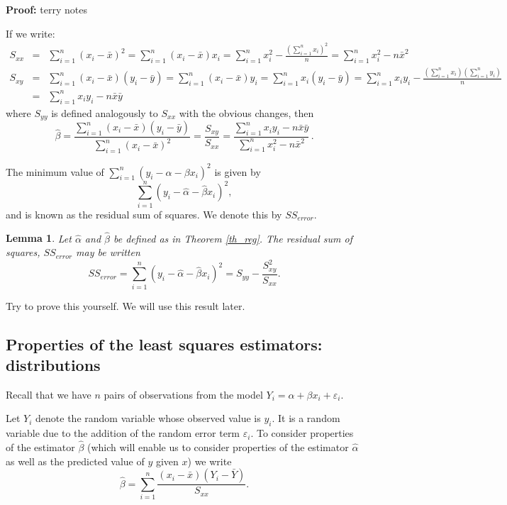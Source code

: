 \documentclass[12pt]{article}
\newtheorem{lemma}[theorem]{Lemma}
\begin{document}
\begin{mdframed}
{\bf Proof:}
\textcolor[rgb]{1.00,1.00,1.00}{terry notes\lipsum[1-7]}
\end{mdframed}

If we write:
\begin{eqnarray*}
S_{xx}&=&\sum_{i=1}^{n}(x_{i}-\bar{x})^{2}=\sum_{i=1}^{n}(x_{i}-\bar{x})x_{i}=\sum_{i=1}^{n}x_{i}^{2}-\frac{(\sum_{i=1}^{n}x_{i})^{2}}{n}=\sum_{i=1}^{n}x_{i}^{2}-n\bar{x}^{2}\\
S_{xy}&=&\sum_{i=1}^{n}(x_{i}-\bar{x})(y_{i}-\bar{y})=\sum_{i=1}^{n}(x_{i}-\bar{x})y_{i}=\sum_{i=1}^{n}x_{i}(y_{i}-\bar{y})=\sum_{i=1}^{n}x_{i}y_{i}-\frac{\left(\sum_{i=1}^{n}x_{i}\right)\left(\sum_{i=1}^{n}y_{i}\right)}{n}\\&=&\sum_{i=1}^{n}x_{i}y_{i}-n\bar{x}\bar{y}
\end{eqnarray*}
where $S_{yy}$ is defined analogously to $S_{xx}$ with the obvious changes, then $$\hat{\beta}=\frac{\sum_{i=1}^{n}(x_{i}-\bar{x})(y_{i}-\bar{y})}{\sum_{i=1}^{n}(x_{i}-\bar{x})^{2}}=\frac{S_{xy}}{S_{xx}}=\frac{\sum_{i=1}^{n}x_{i}y_{i}-n\bar{x}\bar{y}}{\sum_{i=1}^{n}x_{i}^{2}-n\bar{x}^{2}}\,.$$

The minimum value of $\sum_{i=1}^{n}(y_{i}-\alpha-\beta x_{i})^{2}$ is given by $$\sum_{i=1}^{n}(y_{i}-\hat{\alpha}-\hat{\beta} x_{i})^{2}, $$ and is known as the residual sum of squares. We denote this by $SS_{error}$.
\begin{lemma}
Let $\hat{\alpha}$ and $\hat{\beta}$ be defined as in Theorem \ref{th_reg}. The residual sum of squares, $SS_{error}$ may be written
$$SS_{error}=\sum_{i=1}^{n}(y_{i}-\hat{\alpha}-\hat{\beta} x_{i})^{2}=S_{yy}-\frac{S^{2}_{xy}}{S_{xx}}.$$
\end{lemma}
Try to prove this yourself. We will use this result later.

\subsection{Properties of the least squares estimators: distributions}
Recall that we have $n$ pairs of observations from the model $Y_{i}=\alpha+\beta x_{i} +\varepsilon_{i}$.

Let $Y_{i}$ denote the random variable whose observed value is $y_{i}$. It is a random variable due to the addition of the random error term $\varepsilon_{i}$. To consider properties of the estimator $\hat{\beta}$ (which will enable us to consider properties of the estimator $\hat{\alpha}$ as well as the predicted value of $y$ given $x$) we write
$$
\hat{\beta}=\sum_{i=1}^{n}\frac{(x_{i}-\bar{x})(Y_{i}-\bar{Y})}{S_{xx}}.
$$
\end{document}
